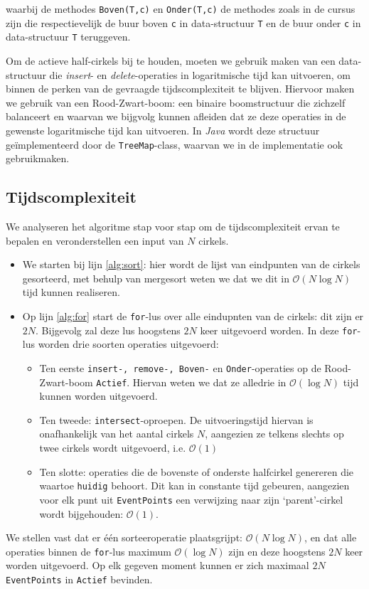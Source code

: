 \documentclass[12pt]{article}
\begin{document}
waarbij de methodes \texttt{Boven(T,c)} en \texttt{Onder(T,c)} de methodes zoals in de cursus zijn die respectievelijk de buur boven \texttt{c} in data-structuur \texttt{T} en de buur onder \texttt{c} in data-structuur \texttt{T} teruggeven.


Om de actieve half-cirkels bij te houden, moeten we gebruik maken van een data-structuur die \textit{insert}- en \textit{delete}-operaties in logaritmische tijd kan uitvoeren, om binnen de perken van de gevraagde tijdscomplexiteit te blijven. Hiervoor maken we gebruik van een Rood-Zwart-boom: een binaire boomstructuur die zichzelf balanceert en waarvan we bijgvolg kunnen afleiden dat ze deze operaties in de gewenste logaritmische tijd kan uitvoeren. In \textit{Java} wordt deze structuur geïmplementeerd door de \texttt{TreeMap}-class, waarvan we in de implementatie ook gebruikmaken.

\subsection{Tijdscomplexiteit}
We analyseren het algoritme stap voor stap om de tijdscomplexiteit ervan te bepalen en veronderstellen een input van $N$ cirkels.
\begin{itemize}
	\item  We starten bij lijn \ref{alg:sort}: hier wordt de lijst van eindpunten van de cirkels gesorteerd, met behulp van mergesort weten we dat we dit in $\mathcal{O}(N\log N)$ tijd kunnen realiseren.
	\item Op lijn \ref{alg:for} start de \texttt{for}-lus over alle eindupnten van de cirkels: dit zijn er $2N$. Bijgevolg zal deze lus hoogstens $2N$ keer uitgevoerd worden. In deze \texttt{for}-lus worden drie soorten operaties uitgevoerd:
	\begin{itemize}
		\item Ten eerste \texttt{insert-, remove-, Boven-} en \texttt{Onder}-operaties op de Rood-Zwart-boom \texttt{Actief}. Hiervan weten we dat ze alledrie in $\mathcal{O}(\log N)$ tijd kunnen worden uitgevoerd.
		\item  Ten tweede: \texttt{intersect}-oproepen. De uitvoeringstijd hiervan is onafhankelijk van het aantal cirkels $N$, aangezien ze telkens slechts op twee cirkels wordt uitgevoerd, i.e. $\mathcal{O}(1)$
		\item Ten slotte: operaties die de bovenste of onderste halfcirkel genereren die waartoe \texttt{huidig} behoort. Dit kan in constante tijd gebeuren, aangezien voor elk punt uit \texttt{EventPoints} een verwijzing naar zijn `parent'-cirkel wordt bijgehouden: $\mathcal{O}(1)$.
	\end{itemize}
\end{itemize}
We stellen vast dat er één sorteeroperatie plaatsgrijpt: $\mathcal{O}(N\log N)$, en dat alle operaties binnen de \texttt{for}-lus maximum $\mathcal{O}(\log N)$ zijn en deze hoogstens $2N$ keer worden uitgevoerd. Op elk gegeven moment kunnen er zich maximaal $2N$ \texttt{EventPoints} in \texttt{Actief} bevinden.
\end{document}
